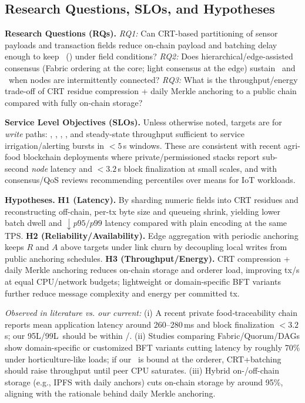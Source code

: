 \documentclass[12pt,onecolumn]{IEEEtran} %
\begin{document}
\subsection{Research Questions, SLOs, and Hypotheses}
\label{sec:rqs-slos}
\textbf{Research Questions (RQs).}
\emph{RQ1:} Can CRT-based partitioning of sensor payloads and transaction fields reduce on-chain payload and batching delay enough to keep \SLOpL\ (\SLOpLnn) under field conditions? 
\emph{RQ2:} Does hierarchical/edge-assisted consensus (Fabric ordering at the core; light consensus at the edge) sustain \SLOR\ and \SLOA\ when nodes are intermittently connected? 
\emph{RQ3:} What is the throughput/energy trade-off of CRT residue compression + daily Merkle anchoring to a public chain compared with fully on-chain storage?

\textbf{Service Level Objectives (SLOs).}
Unless otherwise noted, targets are for \emph{write} paths: \SLOpL, \SLOpLnn, \SLOR, \SLOA, and steady-state throughput sufficient to service irrigation/alerting bursts in $<\!5$\,s windows.
These are consistent with recent agri-food blockchain deployments where private/permissioned stacks report sub-second \emph{node} latency and $<\!3.2$\,s block finalization at small scales, and with consensus/QoS reviews recommending percentiles over means for IoT workloads\cite{oh2025foodsafety,haque2024scalable}.

\textbf{Hypotheses.}
\textbf{H1 (Latency).} By sharding numeric fields into CRT residues and reconstructing off-chain, per-tx byte size and queueing shrink, yielding lower batch dwell and $\downarrow p95/p99$ latency compared with plain encoding at the same TPS. 
\textbf{H2 (Reliability/Availability).} Edge aggregation with periodic anchoring keeps $R$ and $A$ above targets under link churn by decoupling local writes from public anchoring schedules.
\textbf{H3 (Throughput/Energy).} CRT compression + daily Merkle anchoring reduces on-chain storage and orderer load, improving tx/s at equal CPU/network budgets; lightweight or domain-specific BFT variants further reduce message complexity and energy per committed tx\cite{haque2024scalable,coinspaid2023dag}.

\noindent\emph{Observed in literature vs. our current:}
(i) A recent private food‑traceability chain reports mean application latency around 260–280\,ms and block finalization $<\!3.2$\,s; our \CurrentP95L/\CurrentP99L\ should be within \SLOpL/\SLOpLnn\cite{oh2025foodsafety}. 
(ii) Studies comparing Fabric/Quorum/DAGs show domain-specific or customized BFT variants cutting latency by roughly 70\% under horticulture-like loads; if our \CurrentTPS\ is bound at the orderer, CRT+batching should raise throughput until peer CPU saturates\cite{haque2024scalable}. 
(iii) Hybrid on-/off-chain storage (e.g., IPFS with daily anchors) cuts on-chain storage by around 95\%, aligning with the rationale behind daily Merkle anchoring\cite{haque2024scalable}.
\end{document}
